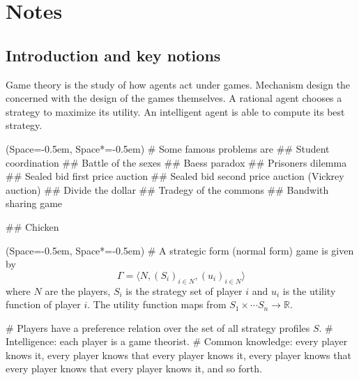 \documentclass[12pt, a4paper]{article}
\title{\Title}
\author{\Author}
\date{Last updated \today.}
\newcommand{\listSpace}{-0.5em}%
\begin{document}
\maketitle
\begin{abstract}
	\noindent 
	This document contains notes on game theory and mechanism design.
	
%		
%		
%		
%		
	

\end{abstract}

{\small \tableofcontents}


\clearpage

\section{Notes}

\subsection{Introduction and key notions}

Game theory is the study of how agents act under games.
Mechanism design the concerned with the design of the games themselves.
A rational agent chooses a strategy to maximize its utility.
An intelligent agent is able to compute its best strategy.

\begin{easylist}[itemize]
	\ListProperties(Space=\listSpace, Space*=\listSpace)
	# Some famous problems are
	## Student coordination
	## Battle of the sexes
	## Baess paradox
	## Prisoners dilemma
	## Sealed bid first price auction
	## Sealed bid second price auction (Vickrey auction)
	## Divide the dollar
	## Tradegy of the commons
	## Bandwith sharing game
	
	## Chicken
\end{easylist}


\begin{easylist}[itemize]
\ListProperties(Space=\listSpace, Space*=\listSpace)
# A strategic form (normal form) game is given by
\begin{equation*}
\Gamma = 
\langle N, (S_i)_{i \in N}, (u_i)_{i \in N}\rangle
\end{equation*}
where $N$ are the players, $S_i$ is the strategy set of player $i$ and $u_i$ is the utility function of player $i$.
The utility function maps from $S_1 \times \cdots S_n \to \mathbb{R}$.

# Players have a preference relation over the set of all strategy profiles $S$.
# Intelligence: each player is a game theorist.
# Common knowledge: every player knows it, every player knows that every player knows it, every player knows that every player knows that every player knows it, and so forth.
\end{easylist}
\end{document}
